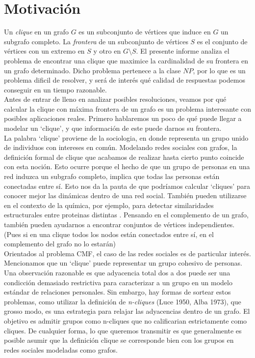 
\section{Motivación}

Un \textit{clique} en un grafo $G$ es un subconjunto de vértices que induce en $G$ un subgrafo completo. La \textit{frontera} de un subconjunto de vértices $S$ es el conjunto de vértices con un extremo en $S$ y otro en $G \setminus S$. El presente informe analiza el problema de encontrar una clique que maximice la cardinalidad de su frontera en un grafo determinado. Dicho problema pertenece a la clase $NP$, por lo que es un problema dificil de resolver, y será de interés qué calidad de respuestas podemos conseguir en un tiempo razonable. \\

Antes de entrar de lleno en analizar posibles resoluciones, veamos por qué calcular la clique con máxima frontera de un grafo es un problema interesante con posibles aplicaciones reales. Primero hablaremos un poco de qué puede llegar a modelar un `clique', y que información de este puede darnos su frontera. \\

La palabra `clique' proviene de la sociologia, en donde representa un grupo unido de individuos con intereses en común. Modelando redes sociales con grafos, la definición formal de clique que acabamos de realizar hasta cierto punto coincide con esta noción. Esto ocurre porque el hecho de que un grupo de personas en una red induzca un subgrafo completo, implica que todas las personas están conectadas entre sí. Esto nos da la pauta de que podríamos calcular `cliques' para conocer mejor las dinámicas dentro de una red social. También pueden utilizarse en el contexto de la química, por ejemplo, para detectar similaridades estructurales entre proteinas distintas \cite{proteins}. Pensando en el complemento de un grafo, también pueden ayudarnos a encontrar conjuntos de vértices independientes. (Pues si en una clique todos los nodos están conectados entre sí, en el complemento del grafo no lo estarán) \\

Orientados al problema CMF, el caso de las redes sociales es de particular interés. Mencionamos que un `clique' puede representar un grupo cohesivo de personas. Una observación razonable es que adyacencia total dos a dos puede ser una condicción demasiado restrictiva para caracterizar a un grupo en un modelo estándar de relaciones personales. Sin embargo, hay formas de sortear estos problemas, como utilizar la definición de \textit{n-cliques} (Luce 1950, Alba 1973), que grosso modo, es una estrategia para relajar las adyacencias dentro de un grafo. El objetivo es admitir grupos como n-cliques que no calificarian estrictamente como cliques. De cualquier forma, lo que queremos transmitir es que generalmente es posible asumir que la definición clique se corresponde bien con los grupos en redes sociales modeladas como grafos. \\

